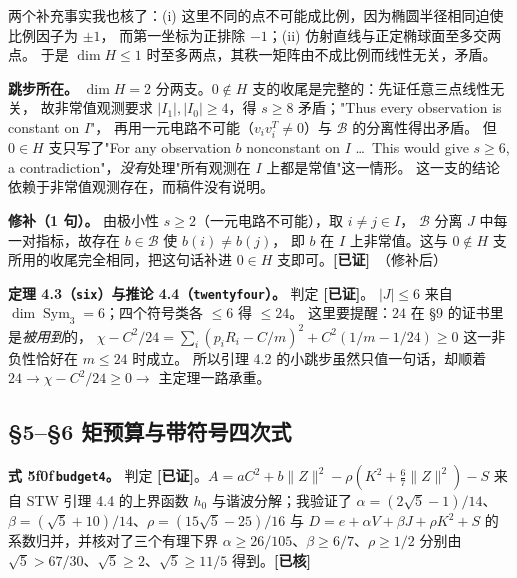 \documentclass[UTF8,11pt]{ctexart}
\theoremstyle{definition}
\newcommand{\peq}[1]{\textup{\u5f0f}\,\texttt{#1}}
\newcommand{\ok}{\textcolor[rgb]{0.05,0.45,0.15}{\bfseries [已证]}}
\newcommand{\chk}{\textcolor[rgb]{0.05,0.25,0.55}{\bfseries [已核]}}
\begin{document}
两个补充事实我也核了：(i) 这里不同的点不可能成比例，因为椭圆半径相同迫使比例因子为 $\pm1$，
而第一坐标为正排除 $-1$；(ii) 仿射直线与正定椭球面至多交两点。
于是 $\dim H\le1$ 时至多两点，其秩一矩阵由不成比例而线性无关，矛盾。

\textbf{跳步所在。} $\dim H=2$ 分两支。$0\notin H$ 支的收尾是完整的：先证任意三点线性无关，
故非常值观测要求 $|I_1|,|I_0|\ge4$，得 $s\ge8$ 矛盾；"Thus every observation is constant on $I$"，
再用一元电路不可能（$v_iv_i^T\ne0$）与 $\mathcal B$ 的分离性得出矛盾。
但 $0\in H$ 支只写了"For any observation $b$ nonconstant on $I$ \dots\ This would give $s\ge6$,
a contradiction"，\emph{没有}处理"所有观测在 $I$ 上都是常值"这一情形。
这一支的结论依赖于非常值观测存在，而稿件没有说明。

\textbf{修补（1 句）。} 由极小性 $s\ge2$（一元电路不可能），取 $i\ne j\in I$，
$\mathcal B$ 分离 $J$ 中每一对指标，故存在 $b\in\mathcal B$ 使 $b(i)\ne b(j)$，
即 $b$ 在 $I$ 上非常值。这与 $0\notin H$ 支所用的收尾完全相同，把这句话补进 $0\in H$ 支即可。\hfill\ok\ （修补后）

\textbf{定理 4.3（\texttt{six}）与推论 4.4（\texttt{twentyfour}）。} 判定 \ok。
$|J|\le6$ 来自 $\dim\operatorname{Sym}_3=6$；四个符号类各 $\le6$ 得 $\le24$。
这里要提醒：$24$ 在 \S9 的证书里是\emph{被用到}的，
$\chi-C^2/24=\sum_i(p_iR_i-C/m)^2+C^2(1/m-1/24)\ge0$ 这一非负性恰好在 $m\le24$ 时成立。
所以引理 4.2 的小跳步虽然只值一句话，却顺着 $24\to\chi-C^2/24\ge0\to$ 主定理一路承重。

\subsection{\S5--\S6 矩预算与带符号四次式}

\textbf{式 \peq{budget4}。} 判定 \ok。$A=aC^2+b\|Z\|^2-\rho(K^2+\frac67\|Z\|^2)-S$ 来自
STW 引理 4.4 的上界函数 $h_0$ 与谐波分解；我验证了
$\alpha=(2\sqrt5-1)/14$、$\beta=(\sqrt5+10)/14$、$\rho=(15\sqrt5-25)/16$ 与
$D=e+\alpha V+\beta J+\rho K^2+S$ 的系数归并，并核对了三个有理下界
$\alpha\ge26/105$、$\beta\ge6/7$、$\rho\ge1/2$ 分别由 $\sqrt5>67/30$、$\sqrt5\ge2$、$\sqrt5\ge11/5$ 得到。\hfill\chk
\end{document}
